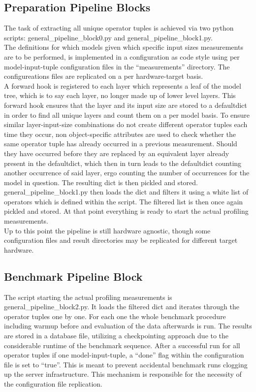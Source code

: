 \documentclass[conference]{IEEEtran}
\begin{document}
\subsection{Preparation Pipeline Blocks}
The task of extracting all unique operator tuples is achieved via two python scripts:  general\_pipeline\_block0.py and general\_pipeline\_block1.py. \\
The definitions for which models given which specific input sizes measurements are to be performed, is implemented in a configuration as code style using per model-input-tuple configuration files in the “measurements” directory. The configureations files are replicated on a per hardware-target basis.\\
A forward hook is registered to each layer which represents a leaf of the model tree, which is to say each layer, no longer made up of lower level layers. This forward hook ensures that the layer and its input size are stored to a defaultdict in order to find all unique layers and count them on a per model basis. To ensure similar layer-input-size combinations do not create different operator tuples each time they occur, non object-specific attributes are used to check whether the same operator tuple has already occurred in a previous measurement. Should they have occurred before they are replaced by an equivalent layer already present in the defaultdict, which then in turn leads to the defaultdict counting another occurrence of said layer, ergo counting the number of occurrences for the model in question. The resulting dict is then pickled and stored. \\
general\_pipeline\_block1.py then loads the dict and filters it using a white list of operators which is defined within the script. The filtered list is then once again pickled and stored. At that point everything is ready to start the actual profiling measurements. \\
Up to this point the pipeline is still hardware agnostic, though some configuration files and result directories may be replicated for different target hardware.

\subsection{Benchmark Pipeline Block}
The script starting the actual profiling measurements is general\_pipeline\_block2.py. It loads the filtered dict and iterates through the operator tuples one by one. For each one the whole benchmark procedure including warmup before and evaluation of the data afterwards is run. The results are stored in a database file, utilizing a checkpointing approach due to the considerable runtime of the benchmark sequence. After a successful run for all operator tuples if one model-input-tuple, a “done” flag within the configuration file is set to “true”. This is meant to prevent accidental benchmark runs clogging up the server infrastructure. This mechanism is responsible for the necessity of the configuration file replication. \\
\end{document}
